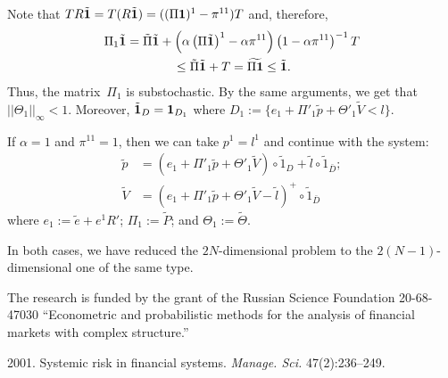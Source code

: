 \begin{multicols}{2}
Note that $TR \tilde {\bf 1} = T (R \tilde {\bf 1}) = ((\Pi{\bf 1})^1 - \pi^{11}) T$  and, therefore,   
\begin{multline*}
\Pi_1\tilde {\bf 1}=\tilde \Pi \tilde {\bf 1} + 
\left(\alpha \left(\Pi\tilde {\bf 1}\right)^1 - \alpha \pi^{11}\right) 
\left(1 -\alpha \pi^{11}\right)^{-1} T \\
{}\le\tilde \Pi \tilde {\bf 1} + T =\widetilde {\Pi{\bf 1}}\le \tilde {\bf 1}. 
\end{multline*}
Thus, the matrix~$\Pi_1$ is substochastic. By the same arguments, we get that $||\Theta_1||_\infty<1$.
Moreover,  $ \tilde {\bf 1}_{D}={\bf 1}_{D_1}$ where 
$D_1 := \{ e_1 + \Pi'_1\tilde  p + \Theta'_1 \tilde V <  l  \}$. 
 

If $\alpha=1$ and $\pi^{11}=1$, then we can take $p^1=l^1$ and continue with the system:  
\begin{align*}
\tilde p&=\left(e_1 +  \Pi'_1 \tilde p + \Theta'_1 \tilde V\right) \circ \tilde 1_{D} + \tilde l \circ \tilde 1_{\bar D}; \\
\tilde V&= \left(e_1 + \Pi'_1 \tilde p + \Theta'_1 \tilde V - \tilde l\right)^+ \circ \tilde 1_{\bar D}  
\end{align*}
where $e_1:=\tilde e+e^1R'$; $ \Pi_1:=\tilde P$; and $\Theta_1:=\tilde \Theta$.

\pagebreak

In both cases,  we have reduced the $2N$-dimensional problem to the $2(N-1)$-dimensional 
one of the same type. 

\vspace*{-12pt}


\Ack

\vspace*{-4pt}

\noindent
The research is funded by the grant of the Russian Science Foundation 20-68-47030 ``Econometric and probabilistic methods for the analysis of financial markets with complex structure.''
 


\renewcommand{\bibname}{\protect\rmfamily References}

\vspace*{-6pt}


{\small\frenchspacing
{%
\begin{thebibliography}{9}



 2001. Systemic risk in financial systems.  \textit{Manage. Sci.} 47(2):236--249.


\end{thebibliography}}}
\end{multicols}
